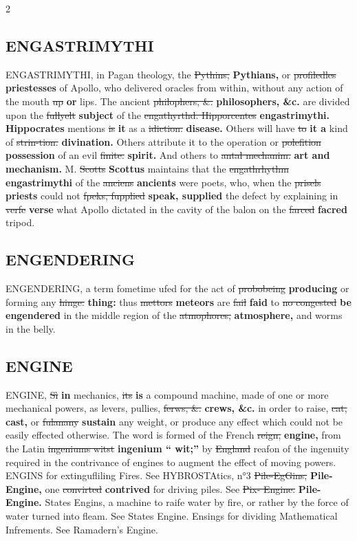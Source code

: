 \documentclass[10pt]{article}
\begin{document}
\begin{multicols}{2}
\subsection*{ENGASTRIMYTHI}
ENGASTRIMYTHI, in Pagan theology, the \sout{Pythins,} \textbf{Pythians,} or \sout{profiledles} \textbf{priestesses} of Apollo, who delivered oracles from within, without any action of the mouth \sout{up} \textbf{or} lips. The ancient \sout{philophers, \&.} \textbf{philosophers, \&c.} are divided upon the \sout{fullyelt} \textbf{subject} of the \sout{engathyrthd. Hipporcentes} \textbf{engastrimythi. Hippocrates} mentions \sout{is} \textbf{it} as a \sout{idiction.} \textbf{disease.} Others will have \sout{to} \textbf{it a} kind of \sout{strin-tion.} \textbf{divination.} Others attribute it to the operation or \sout{polefition} \textbf{possession} of an evil \sout{finite.} \textbf{spirit.} And others to \sout{antal mechanim.} \textbf{art and mechanism.} M. \sout{Scotts} \textbf{Scottus} maintains that the \sout{engathrhythm} \textbf{engastrimythi} of the \sout{anciens} \textbf{ancients} were poets, who, when the \sout{prisels} \textbf{priests} could not \sout{fpeks, fupplied} \textbf{speak, supplied} the defect by explaining in \sout{verfe} \textbf{verse} what Apollo dictated in the cavity of the balon on the \sout{farced} \textbf{facred} tripod.

\subsection*{ENGENDERING}
ENGENDERING, a term fometime ufed for the act of \sout{probobeing} \textbf{producing} or forming any \sout{hinge:} \textbf{thing:} thus \sout{mettors} \textbf{meteors} are \sout{fail} \textbf{faid} to \sout{no congested} \textbf{be engendered} in the middle region of the \sout{atmophores,} \textbf{atmosphere,} and worms in the belly.

\subsection*{ENGINE}
ENGINE, \sout{Sì} \textbf{in} mechanics, \sout{its} \textbf{is} a compound machine, made of one or more mechanical powers, as levers, pullies, \sout{ferws, \&.} \textbf{crews, \&c.} in order to raise, \sout{cat,} \textbf{cast,} or \sout{fulanany} \textbf{sustain} any weight, or produce any effect which could not be easily effected otherwise. The word is formed of the French \sout{reign,} \textbf{engine,} from the Latin \sout{ingeniums witst} \textbf{ingenium “ wit;”} by \sout{England} reafon of the ingenuity required in the contrivance of engines to augment the effect of moving powers. ENGINS for extingufliling Fires. See HYBROSTAtics, n°3 \sout{Pile-EgGins,} \textbf{Pile-Engine,} one \sout{convirted} \textbf{contrived} for driving piles. See \sout{Pix- Engine.} \textbf{Pile-Engine.} States Engins, a machine to raife water by fire, or rather by the force of water turned into fleam. See States Engine. Ensings for dividing Mathematical Infrements. See Ramadern’s Engine.


\end{multicols}
\end{document}
